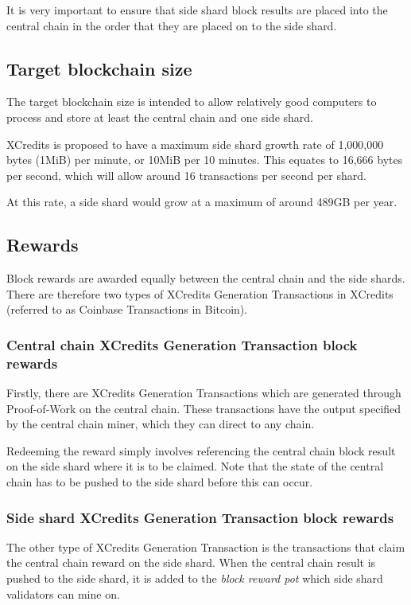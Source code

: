 \documentclass[a4paper,12pt]{article}
\begin{document}
It is very important to ensure that side shard block results are placed into the central chain in the order that they are placed on to the side shard. 

\subsection{Target blockchain size}
The target blockchain size is intended to allow relatively good computers to process and store at least the central chain and one side shard. 

XCredits is proposed to have a maximum side shard growth rate of 1,000,000 bytes (1MiB) per minute, or 10MiB per 10 minutes. This equates to 16,666 bytes per second, which will allow around 16 transactions per second per shard.

At this rate, a side shard would grow at a maximum of around 489GB per year. 


\subsection{Rewards}
Block rewards are awarded equally between the central chain and the side shards. There are therefore two types of XCredits Generation Transactions in XCredits (referred to as Coinbase Transactions in Bitcoin).

\subsubsection{Central chain XCredits Generation Transaction  block rewards}
Firstly, there are XCredits Generation Transactions which are generated through Proof-of-Work on the central chain. These transactions have the output specified by the central chain miner, which they can direct to any chain. 

Redeeming the reward simply involves referencing the central chain block result on the side shard where it is to be claimed. Note that the state of the central chain has to be pushed to the side shard before this can occur. 

\subsubsection{Side shard XCredits Generation Transaction block rewards}
The other type of XCredits Generation Transaction is the transactions that claim the central chain reward on the side shard. When the central chain result is pushed to the side shard, it is added to the \textit{block reward pot} which side shard validators can mine on.
\end{document}
